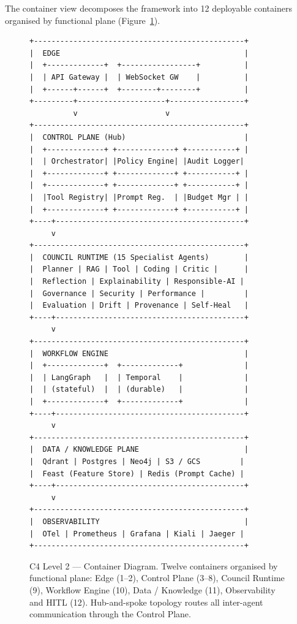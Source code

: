 The container view decomposes the framework into 12 deployable containers organised by functional plane (Figure~\ref{fig:appo_c4l2}).

\begin{figure}[!htbp]
\centering
\begin{minipage}{0.95\textwidth}
\footnotesize\ttfamily
\begin{verbatim}
+------------------------------------------------+
|  EDGE                                          |
|  +-------------+  +-----------------+          |
|  | API Gateway |  | WebSocket GW    |          |
|  +------+------+  +--------+--------+          |
+---------+--------------------+-----------------+
          v                    v
+------------------------------------------------+
|  CONTROL PLANE (Hub)                           |
|  +-------------+ +-------------+ +-----------+ |
|  | Orchestrator| |Policy Engine| |Audit Logger|
|  +-------------+ +-------------+ +-----------+ |
|  +-------------+ +-------------+ +-----------+ |
|  |Tool Registry| |Prompt Reg.  | |Budget Mgr | |
|  +-------------+ +-------------+ +-----------+ |
+----+-------------------------------------------+
     v
+------------------------------------------------+
|  COUNCIL RUNTIME (15 Specialist Agents)        |
|  Planner | RAG | Tool | Coding | Critic |      |
|  Reflection | Explainability | Responsible-AI |
|  Governance | Security | Performance |         |
|  Evaluation | Drift | Provenance | Self-Heal   |
+----+-------------------------------------------+
     v
+------------------------------------------------+
|  WORKFLOW ENGINE                               |
|  +-------------+  +-------------+              |
|  | LangGraph   |  | Temporal    |              |
|  | (stateful)  |  | (durable)   |              |
|  +-------------+  +-------------+              |
+----+-------------------------------------------+
     v
+------------------------------------------------+
|  DATA / KNOWLEDGE PLANE                        |
|  Qdrant | Postgres | Neo4j | S3 / GCS         |
|  Feast (Feature Store) | Redis (Prompt Cache) |
+----+-------------------------------------------+
     v
+------------------------------------------------+
|  OBSERVABILITY                                 |
|  OTel | Prometheus | Grafana | Kiali | Jaeger |
+------------------------------------------------+
\end{verbatim}
\end{minipage}
\caption[C4 Level 2 --- Container Diagram]{C4 Level 2 --- Container Diagram. Twelve containers organised by functional plane: Edge (1--2), Control Plane (3--8), Council Runtime (9), Workflow Engine (10), Data / Knowledge (11), Observability and HITL (12). Hub-and-spoke topology routes all inter-agent communication through the Control Plane.}
\label{fig:appo_c4l2}
\end{figure}

